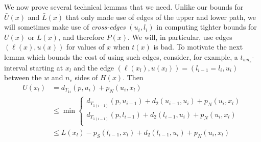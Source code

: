 We now prove several technical lemmas that we need. Unlike our bounds for
${\bar U}(x)$ and ${\bar L}(x)$ that only made use of edges of the upper and
lower path, we will sometimes make use of {\em cross-edges} $(u_i,l_i)$ in 
computing tighter bounds for $U(x)$ or $L(x)$, and therefore $P(x)$. We will,
in particular, use edges  $(\ell(x),u(x))$ for values of $x$ when $t(x)$ is bad.
To motivate the next lemma which bounds the cost of using such edges, consider,
for example, a  $t_{wn_e}$-interval starting at $x_l$ and the edge 
$(\ell(x_l), u(x_l)) = (l_{i-1}=l_i, u_i)$ between the $w$ and $n_e$ sides of 
$H(x)$. Then
\begin{align*} 
U(x_l) & = d_{T_{1i}}(p,u_i) + p_N(u_i, x_l) \nonumber \\
       & \leq \min \begin{cases}
                 d_{T_{1(i-1)}}(p,u_{i-1}) + d_2(u_{i-1},u_i) + p_N(u_i, x_l) \\ 
                 d_{T_{1(i-1)}}(p,l_{i-1}) + d_2(l_{i-1},u_i) + p_N(u_i, x_l) \\
                   \end{cases} \\ \nonumber
       & \leq L(x_l) - p_S(l_{i-1},x_l) + d_2(l_{i-1},u_i) + p_N(u_i, x_l)
\end{align*}

